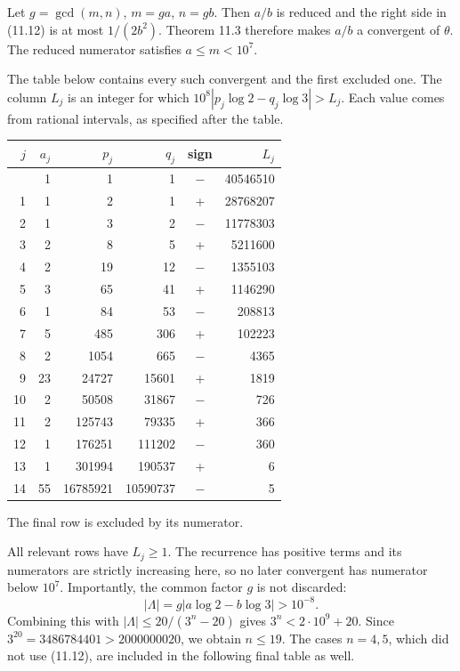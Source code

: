 \documentclass[
  11pt,
  a4paper,
]{article}
\newcounter{none} %
\begin{document}
Let \(g=\gcd(m,n)\), \(m=ga\), \(n=gb\). Then \(a/b\) is reduced and the
right side in (11.12) is at most \(1/(2b^2)\). Theorem 11.3 therefore
makes \(a/b\) a convergent of \(\theta\). The reduced numerator
satisfies \(a\le m<10^7\).

The table below contains every such convergent and the first excluded
one. The column \(L_j\) is an integer for which
\(10^8|p_j\log2-q_j\log3|>L_j\). Each value comes from rational
intervals, as specified after the table.

{\def\LTcaptype{none} %
\begin{longtable}[]{@{}rrrrcr@{}}
\toprule\noalign{}
\(j\) & \(a_j\) & \(p_j\) & \(q_j\) & sign & \(L_j\) \\
\midrule\noalign{}
\endhead
\bottomrule\noalign{}
\endlastfoot
0 & 1 & 1 & 1 & \(-\) & 40546510 \\
1 & 1 & 2 & 1 & + & 28768207 \\
2 & 1 & 3 & 2 & \(-\) & 11778303 \\
3 & 2 & 8 & 5 & + & 5211600 \\
4 & 2 & 19 & 12 & \(-\) & 1355103 \\
5 & 3 & 65 & 41 & + & 1146290 \\
6 & 1 & 84 & 53 & \(-\) & 208813 \\
7 & 5 & 485 & 306 & + & 102223 \\
8 & 2 & 1054 & 665 & \(-\) & 4365 \\
9 & 23 & 24727 & 15601 & + & 1819 \\
10 & 2 & 50508 & 31867 & \(-\) & 726 \\
11 & 2 & 125743 & 79335 & + & 366 \\
12 & 1 & 176251 & 111202 & \(-\) & 360 \\
13 & 1 & 301994 & 190537 & + & 6 \\
14 & 55 & 16785921 & 10590737 & \(-\) & 5 \\
\end{longtable}
}

The final row is excluded by its numerator.

All relevant rows have \(L_j\ge1\). The recurrence has positive terms
and its numerators are strictly increasing here, so no later convergent
has numerator below \(10^7\). Importantly, the common factor \(g\) is
not discarded: \[
|\Lambda|=g|a\log2-b\log3|>10^{-8}.
\] Combining this with \(|\Lambda|\le20/(3^n-20)\) gives
\(3^n<2\cdot10^9+20\). Since \(3^{20}=3486784401>2000000020\), we obtain
\(n\le19\). The cases \(n=4,5\), which did not use (11.12), are included
in the following final table as well.
\end{document}
